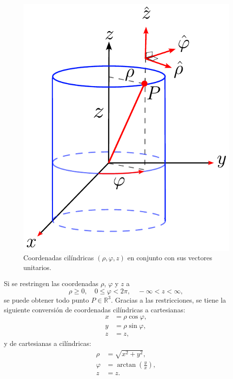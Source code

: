 \begin{figure}[H]
    \centering
    \includegraphics[scale = 0.7]{Figuras/Coordenadas-Cilindricas.pdf}
    \caption{Coordenadas cilíndricas $(\rho,\varphi, z)$ en conjunto con sus vectores unitarios.}
    \label{fig:Coordenadas-Cilindricas}
\end{figure}

Si se restringen las coordenadas $\rho$, $\varphi$ y $z$ a
\begin{equation}
\rho \geq 0, \quad 0 \leq \varphi < 2\pi, \quad -\infty < z < \infty,
\end{equation}
se puede obtener todo punto $P \in \mathbb{R}^3$. Gracias a las restricciones, se tiene la siguiente conversión de coordenadas cilíndricas a cartesianas:
\begin{align}
    x &= \rho \cos \varphi,\\
    y &= \rho \sin \varphi ,\\
    z &= z,
\end{align}
y de cartesianas a cilíndricas:
\begin{align}
    \rho &= \sqrt{x^2+y^2}, \\
    \varphi &= \arctan \left( \frac{y}{x} \right), \\
    z &= z .
\end{align}

